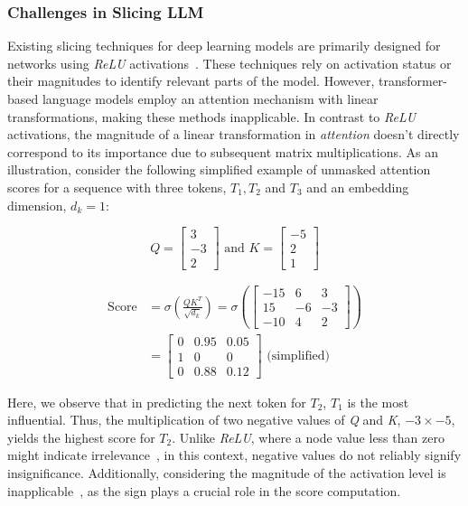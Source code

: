 \subsubsection{Challenges in Slicing LLM}
Existing slicing techniques for deep learning models are primarily designed for networks using \textit{ReLU} activations~\cite{zhang2022remos,zhang2020dynamic}. These techniques rely on activation status or their magnitudes to identify relevant parts of the model. However, transformer-based language models employ an attention mechanism with linear transformations, making these methods inapplicable.  In contrast to \textit{ReLU} activations, the magnitude of a linear transformation in \textit{attention} doesn't directly correspond to its importance due to subsequent matrix multiplications. As an illustration, consider the following simplified example of unmasked attention scores for a sequence with three tokens, $T_1, T_2$ and $T_3$ and an embedding dimension, $d_k=1$:

\[
Q=
  \begin{bmatrix}
    3 \\
    -3 \\
    2
  \end{bmatrix}
  \text{ and }
  K=
  \begin{bmatrix}
    -5 \\
    2 \\
    1
  \end{bmatrix}
\]

\begin{align*}
\text{Score} &= \sigma\left(\frac{QK^T}{\sqrt{d_k}}\right) = \sigma\left(
  \begin{bmatrix}
    -15 & 6 & 3\\
    15 & -6 & -3 \\
    -10 & 4 & 2
  \end{bmatrix}\right) \\
&=
   \begin{bmatrix}
    0 & 0.95 & 0.05\\
    1 & 0 & 0 \\
    0 & 0.88 & 0.12
  \end{bmatrix} \text{ (simplified)}
\end{align*}

Here, we observe that in predicting the next token for $T_2$, $T_1$ is the most influential. Thus, the multiplication of two negative values of \textit{Q} and \textit{K}, $-3 \times -5$, yields the highest score for $T_2$. Unlike \textit{ReLU}, where a node value less than zero might indicate irrelevance~\cite{zhang2022remos}, in this context, negative values do not reliably signify insignificance. Additionally, considering the magnitude of the activation level is inapplicable~\cite{zhang2020dynamic}, as the sign plays a crucial role in the score computation.

